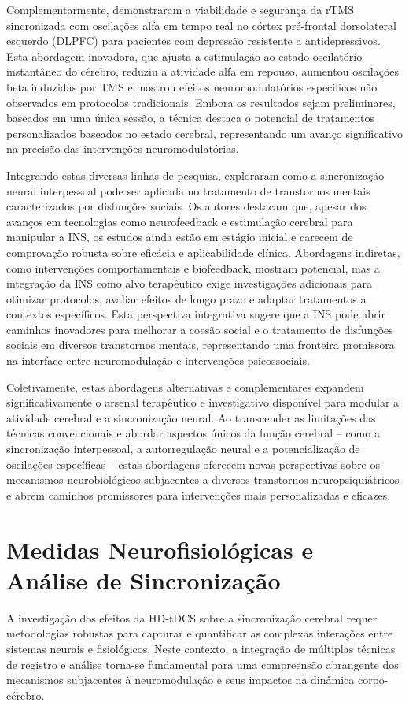 Complementarmente,  demonstraram a viabilidade e segurança da rTMS sincronizada com oscilações alfa em tempo real no córtex pré-frontal dorsolateral esquerdo (DLPFC) para pacientes com depressão resistente a antidepressivos. Esta abordagem inovadora, que ajusta a estimulação ao estado oscilatório instantâneo do cérebro, reduziu a atividade alfa em repouso, aumentou oscilações beta induzidas por TMS e mostrou efeitos neuromodulatórios específicos não observados em protocolos tradicionais. Embora os resultados sejam preliminares, baseados em uma única sessão, a técnica destaca o potencial de tratamentos personalizados baseados no estado cerebral, representando um avanço significativo na precisão das intervenções neuromodulatórias.

Integrando estas diversas linhas de pesquisa,  exploraram como a sincronização neural interpessoal pode ser aplicada no tratamento de transtornos mentais caracterizados por disfunções sociais. Os autores destacam que, apesar dos avanços em tecnologias como neurofeedback e estimulação cerebral para manipular a INS, os estudos ainda estão em estágio inicial e carecem de comprovação robusta sobre eficácia e aplicabilidade clínica. Abordagens indiretas, como intervenções comportamentais e biofeedback, mostram potencial, mas a integração da INS como alvo terapêutico exige investigações adicionais para otimizar protocolos, avaliar efeitos de longo prazo e adaptar tratamentos a contextos específicos. Esta perspectiva integrativa sugere que a INS pode abrir caminhos inovadores para melhorar a coesão social e o tratamento de disfunções sociais em diversos transtornos mentais, representando uma fronteira promissora na interface entre neuromodulação e intervenções psicossociais.

Coletivamente, estas abordagens alternativas e complementares expandem significativamente o arsenal terapêutico e investigativo disponível para modular a atividade cerebral e a sincronização neural. Ao transcender as limitações das técnicas convencionais e abordar aspectos únicos da função cerebral – como a sincronização interpessoal, a autorregulação neural e a potencialização de oscilações específicas – estas abordagens oferecem novas perspectivas sobre os mecanismos neurobiológicos subjacentes a diversos transtornos neuropsiquiátricos e abrem caminhos promissores para intervenções mais personalizadas e eficazes.

\section{Medidas Neurofisiológicas e Análise de Sincronização}
A investigação dos efeitos da HD-tDCS sobre a sincronização cerebral requer metodologias robustas para capturar e quantificar as complexas interações entre sistemas neurais e fisiológicos. Neste contexto, a integração de múltiplas técnicas de registro e análise torna-se fundamental para uma compreensão abrangente dos mecanismos subjacentes à neuromodulação e seus impactos na dinâmica corpo-cérebro.

